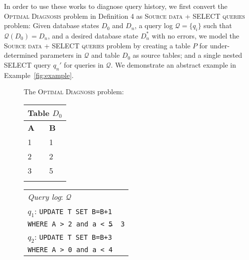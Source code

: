 In order to use these works to diagnose query history, we first convert the \textsc{Optimal Diagnosis} problem in Definition 4 as \textsc{Source data + SELECT queries} problem:
Given database states $D_0$ and $D_n$, a query log $\mathcal{Q} = \{q_i\}$ such that $\mathcal{Q}(D_0) = D_n$, and a desired database state $D_n^*$ with no errors, we model the \textsc{Source data + SELECT queries} problem by creating a table $P$ for under-determined parameters in $\mathcal{Q}$ and table $D_0$ as source tables; and a single nested SELECT query $q_n'$ for queries in $\mathcal{Q}$. We demonstrate an abstract example in Example~\ref{fig:example}.
\begin{figure}[t]
The \textsc{Optimal Diagnosis} problem:\\
    \begin{minipage}[t]{0.1\textwidth}
         \vspace{0pt} 
         \centering
        \begin{tabular}{ll}
            \multicolumn{2}{l}{Table $D_0$}\\
            \toprule
            \textbf{A}  & \textbf{B}\\
            \midrule
			 1 & 1 \\
			 2 & 2 \\
			 3 & 5 \\
            \bottomrule
            \\
        \end{tabular}
    \end{minipage}
    \begin{minipage}[t]{0.2\textwidth}
         \vspace{0pt} 
         \centering
        \begin{tabular}{p{26ex}}
            \multicolumn{1}{l}{\emph{Query log}: $\mathcal{Q}$}\\
            $q_1$: \texttt{\small UPDATE T SET B=B+1}\\
            \texttt{\small WHERE A > 2 and a < \sout{5} {\color{red} 3}} \\
            $q_2$: \texttt{\small UPDATE T SET B=B+3}\\
                  \texttt{\small WHERE A > 0 and a < 4} \\
        \end{tabular}
    \end{minipage}
    \begin{minipage}[t]{0.16\textwidth}
         \vspace{0pt} 
         \centering

\end{minipage}
\end{figure}
